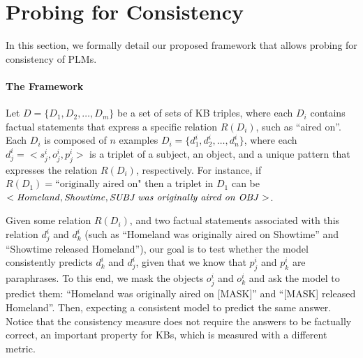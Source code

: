 \section{Probing for Consistency}
\label{sec:framework}

In this section, we formally detail our proposed framework that allows probing for consistency of PLMs.



\paragraph{The Framework}
Let
$D = \{D_1, D_2,
\dots, D_m\}$
be a set of sets of KB triples,
where each $D_i$ contains factual statements
that express a specific relation $R(D_i)$, such as ``aired
on''. Each $D_i$ is composed of $n$ examples $D_i = \{d_1^i,
d_2^i, \dots, d_n^i\}$, where each $d_j^i = <s_j^i, o_j^i,
p_j^i>$ is a triplet of a subject, an object, and a unique
pattern that expresses the relation $R(D_i)$,
respectively. For instance, if $R(D_1)=\text{``originally
  aired on"}$ then a triplet in $D_1$ can be $<
\text{\textit{Homeland}}, \text{\textit{Showtime}},
\text{\textit{SUBJ{} was originally aired on OBJ{}}}>$.



Given some relation $R(D_i)$, and two factual statements associated with this relation $d_j^i$ and $d_k^i$ (such as ``Homeland was originally aired on Showtime'' and ``Showtime released Homeland''), our goal is to test whether the model consistently predicts $d_k^i$ and $d_j^i$, given that we know that $p_j^i$ and $p_k^i$ are paraphrases.
To this end, we mask the objects $o_j^i$ and $o_k^i$ and ask the model to predict them: ``Homeland was originally aired on [MASK]'' and ``[MASK] released Homeland''.
Then, expecting a consistent model to predict the same answer.
Notice that the consistency measure does not require the answers to be factually correct, an important property for KBs, which is measured with a different metric.

